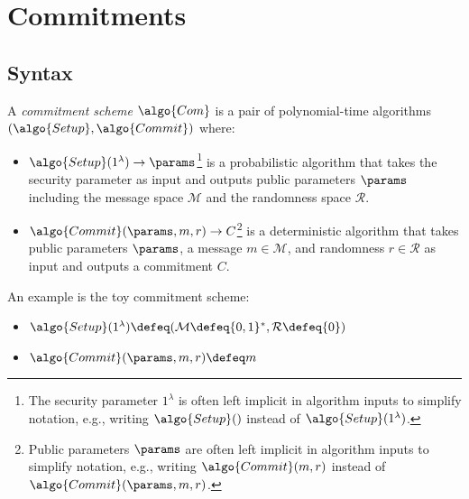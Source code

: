 \section{Commitments}\label{sec:commitments}

\subsection{Syntax}
\begin{definition}
  A \emph{commitment scheme} $\algo{Com}$ is a pair of polynomial-time algorithms $(\algo{Setup}, \algo{Commit})$ where:
  \begin{itemize}
    \item $\algo{Setup}(1^\lambda) \rightarrow \params$\footnote{The security parameter $1^\lambda$ is often left implicit in algorithm inputs to simplify notation, e.g., writing $\algo{Setup}()$ instead of $\algo{Setup}(1^\lambda)$.} is a probabilistic algorithm that takes the security parameter as input and outputs public parameters $\params$ including the message space $\mathcal{M}$ and the randomness space $\mathcal{R}$.
    \item $\algo{Commit}(\params, m, r) \rightarrow C$\footnote{Public parameters $\params$ are often left implicit in algorithm inputs to simplify notation, e.g., writing $\algo{Commit}(m, r)$ instead of $\algo{Commit}(\params, m, r)$.} is a deterministic algorithm that takes public parameters $\params$, a message $m \in \mathcal{M}$, and randomness $r \in \mathcal{R}$ as input and outputs a commitment $C$.
  \end{itemize}
\end{definition}

\begin{example}
  An example is the toy commitment scheme\label{sec:toy-com}:
  \begin{itemize}
    \item $\algo{Setup}(1^\lambda) \defeq (\mathcal{M} \defeq \{0, 1\}^*, \mathcal{R} \defeq \{0\})$
    \item $\algo{Commit}(\params, m, r) \defeq m$
  \end{itemize}
\end{example}

